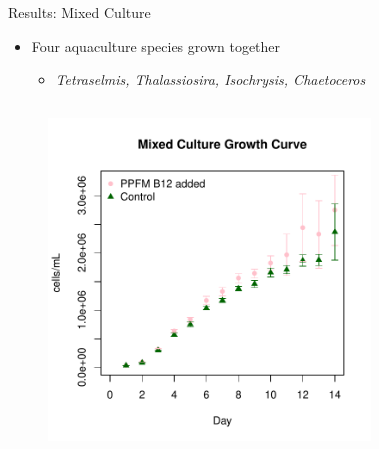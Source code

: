 \documentclass[8pt]{beamer}\usepackage[]{graphicx}\usepackage[]{color}
\begin{document}
\begin{frame}{Results: Mixed Culture}
\begin{itemize}
\item Four aquaculture species grown together
\begin{itemize}
\item \textit{Tetraselmis, Thalassiosira, Isochrysis, Chaetoceros}
\end{itemize}
\end{itemize}
\begin{columns}[t] %
                \begin{figure}
                                \includegraphics[width=1\textwidth]{./figure/MixedCulture_Scatter_with_SD_errors.pdf}
                                \end{figure}
                                \begin{figure}

\end{figure}
\end{columns}
\end{frame}
\end{document}
